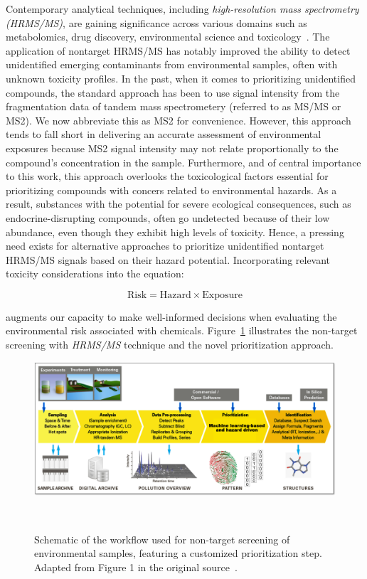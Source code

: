 Contemporary analytical techniques, including \emph{high-resolution mass spectrometry (HRMS/MS)}, are gaining significance across various domains such as metabolomics, drug discovery, environmental science and toxicology~\cite{tamara2022}. The application of nontarget HRMS/MS has notably improved the ability to detect unidentified emerging contaminants from environmental samples, often with unknown toxicity profiles. In the past, when it comes to prioritizing unidentified compounds, the standard approach has been to use signal intensity from the fragmentation data of tandem mass spectrometery (referred to as MS/MS or MS2). We now abbreviate this as MS2 for convenience. However, this approach tends to fall short in delivering an accurate assessment of environmental exposures because MS2 signal intensity may not relate proportionally to the compound's concentration in the sample. Furthermore, and of central importance to this work, this approach overlooks the toxicological factors essential for prioritizing compounds with concers related to environmental hazards. As a result, substances with the potential for severe ecological consequences, such as endocrine-disrupting compounds, often go undetected because of their low abundance, even though they exhibit high levels of toxicity. Hence, a pressing need exists for alternative approaches to prioritize unidentified nontarget HRMS/MS signals based on their hazard potential. Incorporating relevant toxicity considerations into the equation:

\begin{equation}
    \text{Risk} = \text{Hazard} \times \text{Exposure}
\end{equation}

augments our capacity to make well-informed decisions when evaluating the environmental risk associated with chemicals.
Figure~\ref{fig:non_target_high_resolution_mass_spectrometry} illustrates the non-target screening with \emph{HRMS/MS} technique and the novel prioritization \emph{} approach.
 
\begin{figure}[htbp]  %
    \centering
    \includegraphics[width=1.0\textwidth]{figures/non_target_high_resolution_mass_spectrometry.png}  
    \caption{Schematic of the workflow used for non-target screening of environmental samples, featuring a customized prioritization step. Adapted from Figure 1 in the original source~\cite{hollender}.}
~\label{fig:non_target_high_resolution_mass_spectrometry} 
\end{figure}

